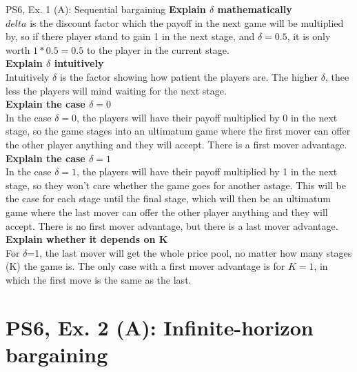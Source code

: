 \begin{frame}{PS6, Ex. 1 (A): Sequential bargaining }
    \textbf{Explain $\delta$ mathematically\\}
    $delta$ is the discount factor which the payoff in the next game will be multiplied by, so if there player stand to gain 1 in the next stage, and $\delta=0.5$, it is only worth $1*0.5=0.5$ to the player in the current stage.\\
    \textbf{Explain $\delta$ intuitively}\\ Intuitively $\delta$ is the factor showing how patient the players are. The higher $\delta$, thee less the players will mind waiting for the next stage.  \\
    \textbf{Explain the case $\delta=0$}\\
    In the case $\delta=0$, the players will have their payoff multiplied by 0 in the next stage, so the game stages into an ultimatum game where the first mover can offer the other player anything and they will accept. There is a first mover advantage. \\
    \textbf{Explain the case $\delta=1$}\\
    In the case $\delta=1$, the players will have their payoff multiplied by 1 in the next stage, so they won't care whether the game goes for another astage. This will be the case for each stage until the final stage, which will then be an ultimatum game where the last mover can offer the other player anything and they will accept. There is no first mover advantage, but there is a last mover advantage. \\
    \textbf{Explain whether it depends on K}\\
    For $\delta$=1, the last mover will get the whole price pool, no matter how many stages (K) the game is. The only case with a first mover advantage is for $K=1$, in which the first move is the same as the last.\\
    \vfill\null
\end{frame}

\section{PS6, Ex. 2 (A): Infinite-horizon bargaining}


